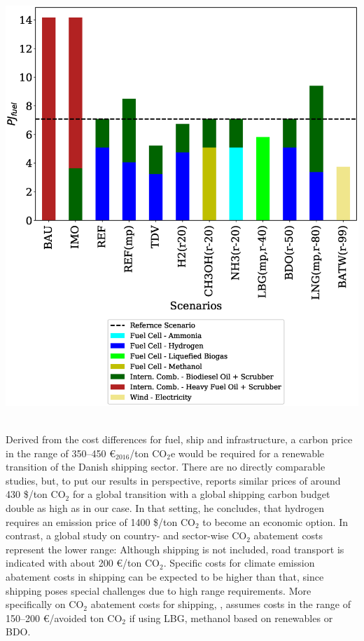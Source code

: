 \documentclass[article]{elsarticle}
\begin{document}
\begin{minipage}[t]{0.49\textwidth}
    \centering
    \captionsetup{justification=centering}
    \includegraphics[width=.95\textwidth]{figures/AllFuel2050.eps}
    \label{fig:AllFuel2050}
\end{minipage}\\[0.75cm]

Derived from the cost differences for fuel, ship and infrastructure, a carbon price in the range of 350--450 \euro$_{2016}$/ton CO$_2$e would be required for a renewable transition of the Danish shipping sector. There are no directly comparable studies, but, to put our results in perspective, \citet[p.197]{Raucci2017} reports similar prices of around 430 \$/ton CO$_2$ for a global transition with a global shipping carbon budget double as high as in our case. In that setting, he concludes, that hydrogen requires an emission price of 1400 \$/ton CO$_2$ to become an economic option. In contrast, a global study on country- and sector-wise CO$_2$ abatement costs \cite{OECD2016} represent the lower range: Although shipping is not included, road transport is indicated with about 200 \euro/ton CO$_2$. Specific costs for climate emission abatement costs in shipping can be expected to be higher than that, since shipping poses special challenges due to high range requirements. More specifically on CO$_2$ abatement costs for shipping, \citet{DNVGL2017}, assumes costs in the range of 150--200 \euro/avoided ton CO$_2$ if using LBG, methanol based on renewables or BDO.
\end{document}
